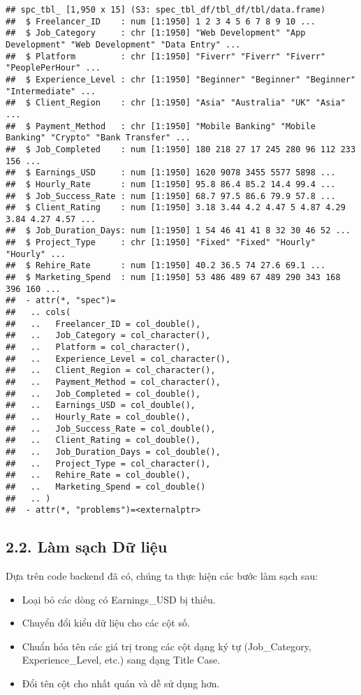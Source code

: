 \documentclass[
]{article}
\begin{document}
\begin{verbatim}
## spc_tbl_ [1,950 x 15] (S3: spec_tbl_df/tbl_df/tbl/data.frame)
##  $ Freelancer_ID    : num [1:1950] 1 2 3 4 5 6 7 8 9 10 ...
##  $ Job_Category     : chr [1:1950] "Web Development" "App Development" "Web Development" "Data Entry" ...
##  $ Platform         : chr [1:1950] "Fiverr" "Fiverr" "Fiverr" "PeoplePerHour" ...
##  $ Experience_Level : chr [1:1950] "Beginner" "Beginner" "Beginner" "Intermediate" ...
##  $ Client_Region    : chr [1:1950] "Asia" "Australia" "UK" "Asia" ...
##  $ Payment_Method   : chr [1:1950] "Mobile Banking" "Mobile Banking" "Crypto" "Bank Transfer" ...
##  $ Job_Completed    : num [1:1950] 180 218 27 17 245 280 96 112 233 156 ...
##  $ Earnings_USD     : num [1:1950] 1620 9078 3455 5577 5898 ...
##  $ Hourly_Rate      : num [1:1950] 95.8 86.4 85.2 14.4 99.4 ...
##  $ Job_Success_Rate : num [1:1950] 68.7 97.5 86.6 79.9 57.8 ...
##  $ Client_Rating    : num [1:1950] 3.18 3.44 4.2 4.47 5 4.87 4.29 3.84 4.27 4.57 ...
##  $ Job_Duration_Days: num [1:1950] 1 54 46 41 41 8 32 30 46 52 ...
##  $ Project_Type     : chr [1:1950] "Fixed" "Fixed" "Hourly" "Hourly" ...
##  $ Rehire_Rate      : num [1:1950] 40.2 36.5 74 27.6 69.1 ...
##  $ Marketing_Spend  : num [1:1950] 53 486 489 67 489 290 343 168 396 160 ...
##  - attr(*, "spec")=
##   .. cols(
##   ..   Freelancer_ID = col_double(),
##   ..   Job_Category = col_character(),
##   ..   Platform = col_character(),
##   ..   Experience_Level = col_character(),
##   ..   Client_Region = col_character(),
##   ..   Payment_Method = col_character(),
##   ..   Job_Completed = col_double(),
##   ..   Earnings_USD = col_double(),
##   ..   Hourly_Rate = col_double(),
##   ..   Job_Success_Rate = col_double(),
##   ..   Client_Rating = col_double(),
##   ..   Job_Duration_Days = col_double(),
##   ..   Project_Type = col_character(),
##   ..   Rehire_Rate = col_double(),
##   ..   Marketing_Spend = col_double()
##   .. )
##  - attr(*, "problems")=<externalptr>
\end{verbatim}

\subsection{2.2. Làm sạch Dữ
liệu}\label{luxe0m-sux1ea1ch-dux1eef-liux1ec7u}

Dựa trên code backend đã có, chúng ta thực hiện các bước làm sạch sau:

\begin{itemize}
\item
  Loại bỏ các dòng có Earnings\_USD bị thiếu.
\item
  Chuyển đổi kiểu dữ liệu cho các cột số.
\item
  Chuẩn hóa tên các giá trị trong các cột dạng ký tự (Job\_Category,
  Experience\_Level, etc.) sang dạng Title Case.
\item
  Đổi tên cột cho nhất quán và dễ sử dụng hơn.
\end{itemize}
\end{document}
